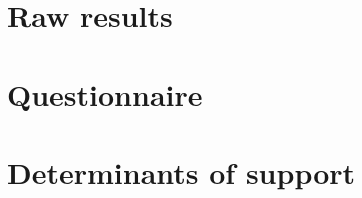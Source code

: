 \clearpage
\section{Raw results%
}\label{app:raw_results}




\renewcommand{\theenumi}{\arabic{enumi}}
\clearpage
\section{Questionnaire}\label{app:questionnaire}


\clearpage
\section{Determinants of support}\label{app:determinants}

%         

